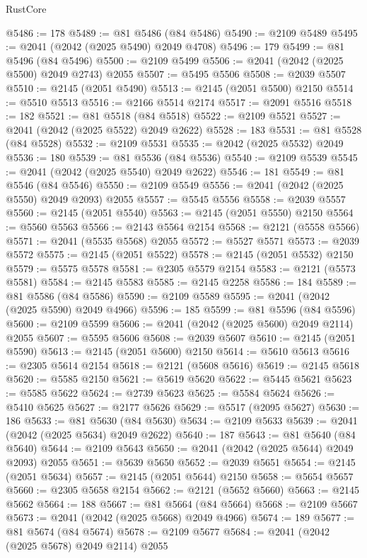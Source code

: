 \begin{lexlean}{RustCore}
\begin{coremodule}
@5486 := 178
@5489 := @81 @5486 (@84 @5486)
@5490 := @2109 @5489
@5495 := @2041 (@2042 (@2025 @5490) @2049 @4708)
@5496 := 179
@5499 := @81 @5496 (@84 @5496)
@5500 := @2109 @5499
@5506 := @2041 (@2042 (@2025 @5500) @2049 @2743) @2055
@5507 := @5495 @5506
@5508 := @2039 @5507
@5510 := @2145 (@2051 @5490)
@5513 := @2145 (@2051 @5500) @2150
@5514 := @5510 @5513
@5516 := @2166 @5514 @2174
@5517 := @2091 @5516
@5518 := 182
@5521 := @81 @5518 (@84 @5518)
@5522 := @2109 @5521
@5527 := @2041 (@2042 (@2025 @5522) @2049 @2622)
@5528 := 183
@5531 := @81 @5528 (@84 @5528)
@5532 := @2109 @5531
@5535 := @2042 (@2025 @5532) @2049
@5536 := 180
@5539 := @81 @5536 (@84 @5536)
@5540 := @2109 @5539
@5545 := @2041 (@2042 (@2025 @5540) @2049 @2622)
@5546 := 181
@5549 := @81 @5546 (@84 @5546)
@5550 := @2109 @5549
@5556 := @2041 (@2042 (@2025 @5550) @2049 @2093) @2055
@5557 := @5545 @5556
@5558 := @2039 @5557
@5560 := @2145 (@2051 @5540)
@5563 := @2145 (@2051 @5550) @2150
@5564 := @5560 @5563
@5566 := @2143 @5564 @2154
@5568 := @2121 (@5558 @5566)
@5571 := @2041 (@5535 @5568) @2055
@5572 := @5527 @5571
@5573 := @2039 @5572
@5575 := @2145 (@2051 @5522)
@5578 := @2145 (@2051 @5532) @2150
@5579 := @5575 @5578
@5581 := @2305 @5579 @2154
@5583 := @2121 (@5573 @5581)
@5584 := @2145 @5583
@5585 := @2145 @2258
@5586 := 184
@5589 := @81 @5586 (@84 @5586)
@5590 := @2109 @5589
@5595 := @2041 (@2042 (@2025 @5590) @2049 @4966)
@5596 := 185
@5599 := @81 @5596 (@84 @5596)
@5600 := @2109 @5599
@5606 := @2041 (@2042 (@2025 @5600) @2049 @2114) @2055
@5607 := @5595 @5606
@5608 := @2039 @5607
@5610 := @2145 (@2051 @5590)
@5613 := @2145 (@2051 @5600) @2150
@5614 := @5610 @5613
@5616 := @2305 @5614 @2154
@5618 := @2121 (@5608 @5616)
@5619 := @2145 @5618
@5620 := @5585 @2150
@5621 := @5619 @5620
@5622 := @5445 @5621
@5623 := @5585 @5622
@5624 := @2739 @5623
@5625 := @5584 @5624
@5626 := @5410 @5625
@5627 := @2177 @5626
@5629 := @5517 (@2095 @5627)
@5630 := 186
@5633 := @81 @5630 (@84 @5630)
@5634 := @2109 @5633
@5639 := @2041 (@2042 (@2025 @5634) @2049 @2622)
@5640 := 187
@5643 := @81 @5640 (@84 @5640)
@5644 := @2109 @5643
@5650 := @2041 (@2042 (@2025 @5644) @2049 @2093) @2055
@5651 := @5639 @5650
@5652 := @2039 @5651
@5654 := @2145 (@2051 @5634)
@5657 := @2145 (@2051 @5644) @2150
@5658 := @5654 @5657
@5660 := @2305 @5658 @2154
@5662 := @2121 (@5652 @5660)
@5663 := @2145 @5662
@5664 := 188
@5667 := @81 @5664 (@84 @5664)
@5668 := @2109 @5667
@5673 := @2041 (@2042 (@2025 @5668) @2049 @4966)
@5674 := 189
@5677 := @81 @5674 (@84 @5674)
@5678 := @2109 @5677
@5684 := @2041 (@2042 (@2025 @5678) @2049 @2114) @2055

\end{coremodule}
\end{lexlean}
